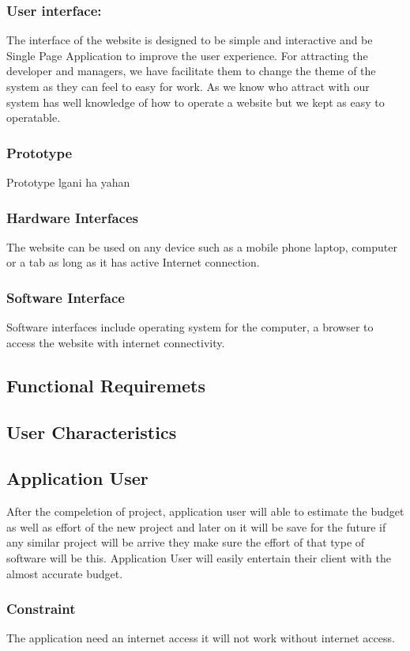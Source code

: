     \subsubsection{User interface: }
    The interface of the website is designed to be simple and interactive and be Single Page Application to improve the user experience. 
    For attracting the developer and managers, we have facilitate them to change the theme of the system as they can feel to easy for work.
    As we know who attract with our system has well knowledge of how to operate a website but we kept as easy to operatable.
    \subsubsection{Prototype}
    {\huge Prototype lgani ha yahan}
    \subsubsection{Hardware Interfaces}
    The website can be used on any device such as a mobile phone laptop, computer or a tab as long as it has active Internet connection.
    \subsubsection{Software Interface}
    Software interfaces include operating system for the computer, a browser to access the website with internet connectivity.
\subsection{Functional Requiremets}
    
    


\subsection{User Characteristics}
\subsection*{Application User}
After the compeletion of project, application user will able to estimate the budget as well as effort of the new project and later on it will be save for the future if any similar project will be arrive they make sure the effort of that type of software will be this.
Application User will easily entertain their client with the almost accurate budget. 
\subsubsection{Constraint}
The application need an internet access it will not work without internet access.

